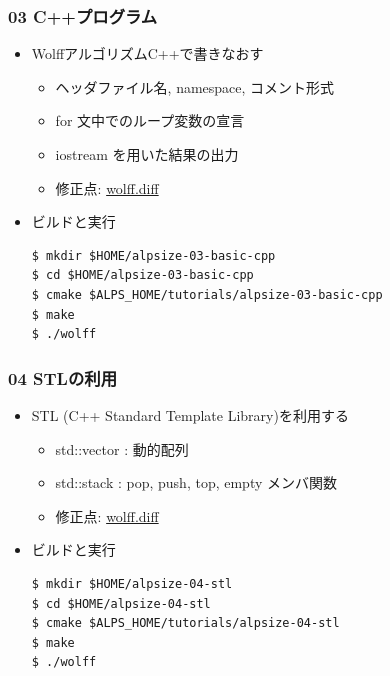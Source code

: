\begin{frame}[fragile]
  \frametitle{03 C++プログラム}
  \begin{itemize}
    \item WolffアルゴリズムC++で書きなおす
      \begin{itemize}
        \item ヘッダファイル名, namespace, コメント形式
        \item for 文中でのループ変数の宣言
        \item iostream を用いた結果の出力
        \item 修正点: \href{https://github.com/cmsi/alps-tutorial/blob/develop/alpsize/03-wolff.diff}{wolff.diff}
      \end{itemize}
    \item ビルドと実行
\begin{lstlisting}
$ mkdir $HOME/alpsize-03-basic-cpp
$ cd $HOME/alpsize-03-basic-cpp
$ cmake $ALPS_HOME/tutorials/alpsize-03-basic-cpp
$ make
$ ./wolff
\end{lstlisting}
  \end{itemize}
\end{frame}

\begin{frame}[fragile]
  \frametitle{04 STLの利用}
  \begin{itemize}
    \item STL (C++ Standard Template Library)を利用する
      \begin{itemize}
        \item std::vector : 動的配列
        \item std::stack : pop, push, top, empty メンバ関数
        \item 修正点: \href{https://github.com/cmsi/alps-tutorial/blob/develop/alpsize/04-wolff.diff}{wolff.diff}
      \end{itemize}
    \item ビルドと実行
\begin{lstlisting}
$ mkdir $HOME/alpsize-04-stl
$ cd $HOME/alpsize-04-stl
$ cmake $ALPS_HOME/tutorials/alpsize-04-stl
$ make
$ ./wolff
\end{lstlisting}
  \end{itemize}
\end{frame}

